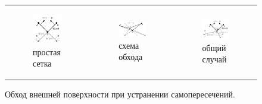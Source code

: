 \documentclass[a4paper,14pt]{extarticle}                     %
\theoremstyle{plain}                                         %
\begin{document}
\begin{figure}[ht]
\centering
\begin{tabular}{lll}
\begin{subfigure}{0.33\textwidth}\centering\includegraphics[width=0.7\columnwidth]{fig/int_walk_simple.pdf}\caption{простая сетка}\end{subfigure} &
\begin{subfigure}{0.33\textwidth}\centering\includegraphics[width=0.7\columnwidth]{fig/int_walk_centre.pdf}\caption{схема обхода}\end{subfigure} &
\begin{subfigure}{0.33\textwidth}\centering\includegraphics[width=0.7\columnwidth]{fig/int_walk_not_simple.pdf}\caption{общий случай}\end{subfigure}
\end{tabular}
\singlespacing
\caption{Обход внешней поверхности при устранении самопересечений.}
\label{fig:int_walk}
\end{figure}
\end{document}
